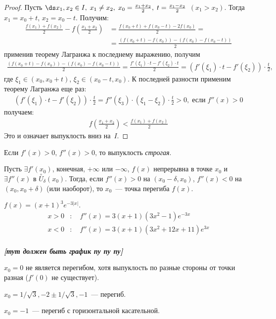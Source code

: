 \begin{proof}
Пусть \(\ds x_1, x_2 \in I, \; x_1 \neq x_2, \; x_0 = \frac{x_1 + x_2}{2}, \;
t = \frac{x_1-x_2}{2}\) \((x_1 > x_2)\). Тогда \(x_1 = x_0 + t\), \(x_2 = x_0 -
t\). Получим:
\begin{align}
    \frac{f(x_1) + f(x_2)}{2} - f\left(\frac{x_1 + x_2}{2}\right) &=
        \frac{f(x_0 + t) + f(x_0 - t) - 2f(x_0)}{2} =\\
        &= \frac{\left(f(x_0 + t) - f(x_0)\right) - \left(f(x_0) - f(x_0 - t)
        \right)}{2}
\end{align}
применив теорему Лагранжа к последнему выражению, получим
\begin{gather}
    \frac{\left(f(x_0 + t) - f(x_0)\right) - \left(f(x_0) - f(x_0 - t)\right)}
        {2} = \frac{f'(\xi_1) \cdot t - f'(\xi_2) \cdot t}{2} = \left(f'(\xi_1)
        \cdot t - f'(\xi_2)\right) \cdot \frac{t}{2},
\end{gather}
где \(\xi_1 \in (x_0, x_0 + t)\), \(\xi_2 \in (x_0 - t, x_0)\). К последней
разности применим теорему Лагранжа еще раз:
\begin{gather}
    \left(f'(\xi_1) \cdot t - f'(\xi_2)\right) \cdot \frac{t}{2} =
        f''(\xi_3) \cdot (\xi_1-\xi_2) \cdot \frac{t}{2} >0, \; \text{если} \;
        f''(x) > 0
\end{gather}
получаем:
\begin{gather}
    f\left(\frac{x_1 + x_2}{2}\right) < \frac{f(x_1) + f(x_2)}{2}
\end{gather}
Это и означает выпуклость вниз на~\(I\).
\end{proof}

\begin{note}
Если \(f'(x) > 0\), \(f''(x) > 0\), то выпуклость \textit{строгая}.
\end{note}

\begin{theorem}
Пусть \(\exists f'(x_0)\), конечная, \(+ \infty\) или \(- \infty\), \(f(x)\)
непрерывна в точке \(x_0\) и \(\exists f''(x)\) в \(\overset{\circ}{U}_{\delta}
(x_0)\). Тогда, если \(f''(x) > 0\) на \((x_0 - \delta, x_0)\), \(f''(x) < 0\)
на \((x_0, x_0 + \delta)\) (или наоборот), то \(x_0\)~--- точка перегиба \(
f(x)\).
\end{theorem}

\begin{example}
\(f(x) = (x + 1)^3e^{-3|x|}\).
\begin{align}
    x > 0&: \quad f''(x) = 3(x + 1)(3x^2 - 1)e^{-3x}\\
    x < 0&: \quad f''(x) = 3(x + 1)(3x^2 + 12x + 11)e^{3x}\\
\end{align}

\textbf{\textit{[тут должен быть график пу пу пу]}}

\(x_0 = 0\) не является перегибом, хотя выпуклость по разные стороны от точки
разная (\(f'(0)\) не существует).

\(x_0 = 1/\sqrt{3}, -2 \pm 1/\sqrt{3}, -1\)~--- перегиб.

\(x_0 = -1\)~--- перегиб с горизонтальной касательной.
\end{example}

